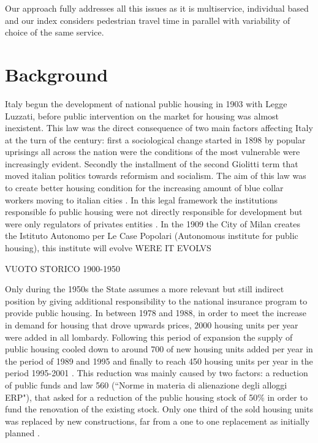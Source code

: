 \documentclass[11pt, titlepage]{article}
\begin{document}
Our approach fully addresses all this issues as it is multiservice, individual based and our index considers pedestrian travel time in parallel with variability of choice of the same service.
 
\section{Background}
\label{back}

Italy begun the development of national public housing in 1903 with Legge Luzzati, before public intervention on the market for housing was almost inexistent. This law was the direct consequence of two main factors affecting Italy at the turn of the century: first a sociological change started in 1898 by popular uprisings all across the nation were the conditions of the most vulnerable were increasingly evident. Secondly the installment of the second Giolitti term that moved italian politics towards reformism and socialism.  The aim of this law was to create better housing condition for the increasing amount of blue collar workers moving to italian cities \parencite{istitutocasepopolari}. In this legal framework the institutions responsible fo public housing were not directly responsible for development but  were only regulators of privates entities \parencite{urbani}. In the 1909 the City of Milan creates the Istituto Autonomo per Le Case Popolari (Autonomous institute for public housing), this institute will evolve WERE IT EVOLVS


VUOTO STORICO 1900-1950

Only during the 1950s the State assumes a more relevant but still indirect position by giving additional responsibility to  the national insurance program to provide public housing. In between 1978 and 1988, in order to meet the increase in demand for housing that drove upwards prices, 2000 housing units per year were added in all lombardy. Following this period of expansion the supply of public housing cooled down to around 700 of new housing units added per year in the period of 1989 and 1995 and finally to reach 450 housing units per year in the period 1995-2001 \parencite{edilizaaler}. This reduction was mainly caused by two factors: a reduction of public funds and law 560 (``Norme in materia di alienazione degli alloggi ERP"), that asked for a reduction of the public housing stock of 50\% in order to fund the renovation of the existing stock. Only one third of the sold housing units was replaced by new constructions, far from a one to one replacement as initially planned  \parencite{Cognetti}.
\end{document}
